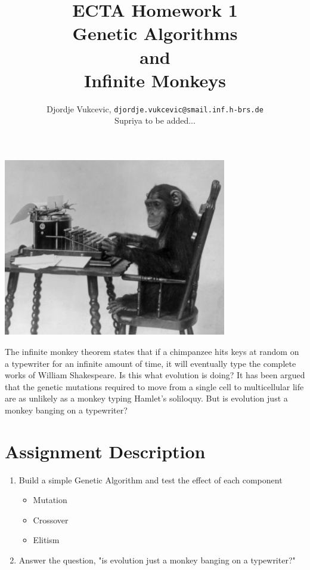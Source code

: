 \documentclass{article}
\title{ECTA Homework 1\\Genetic Algorithms\\and\\Infinite Monkeys}
\author{\color{red} Djordje Vukcevic, \texttt{djordje.vukcevic@smail.inf.h-brs.de}\\
\color{red}	Supriya to be added...}
\begin{document}
\maketitle

\begin{center}
\begin{minipage}{1\linewidth}
	\begin{center}
    \includegraphics[width=0.73\textwidth]{img/chimp}  
    \end{center}
    
	{\large The infinite monkey theorem states that if a chimpanzee hits keys at random on a typewriter for an infinite amount of time, it will eventually type the complete works of William Shakespeare. Is this what evolution is doing? It has been argued that the genetic mutations required to move from a single cell to multicellular life are as unlikely as a monkey typing Hamlet's soliloquy. But is evolution just a monkey banging on a typewriter?}	
\end{minipage}
\end{center}

\section{Assignment Description}
	\begin{enumerate}
		\item Build a simple Genetic Algorithm and test the effect of each component
		\begin{itemize}
			\item Mutation
			\item Crossover
			\item Elitism		
		\end{itemize}
		\item Answer the question, "is evolution just a monkey banging on a typewriter?"	
	\end{enumerate}
\end{document}
